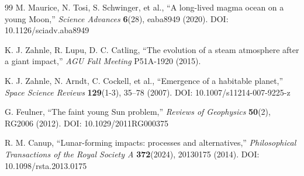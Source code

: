 \documentclass[11pt,a4paper]{article}
\begin{document}
\begin{thebibliography}{99}
		M. Maurice, N. Tosi, S. Schwinger, et al., ``A long-lived magma ocean on a young Moon,''
		\emph{Science Advances} \textbf{6}(28), eaba8949 (2020). DOI: 10.1126/sciadv.aba8949
		
		K. J. Zahnle, R. Lupu, D. C. Catling, ``The evolution of a steam atmosphere after a giant impact,''
		\emph{AGU Fall Meeting} P51A-1920 (2015).
		
		K. J. Zahnle, N. Arndt, C. Cockell, et al., ``Emergence of a habitable planet,''
		\emph{Space Science Reviews} \textbf{129}(1-3), 35–78 (2007). DOI: 10.1007/s11214-007-9225-z
		
		G. Feulner, ``The faint young Sun problem,''
		\emph{Reviews of Geophysics} \textbf{50}(2), RG2006 (2012). DOI: 10.1029/2011RG000375
		
		R. M. Canup, ``Lunar-forming impacts: processes and alternatives,''
		\emph{Philosophical Transactions of the Royal Society A} \textbf{372}(2024), 20130175 (2014). DOI: 10.1098/rsta.2013.0175
		
	\end{thebibliography}
	
\end{document}
